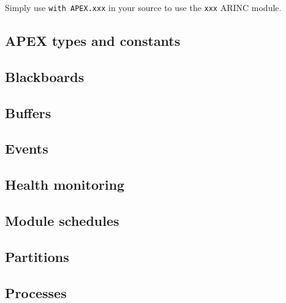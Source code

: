    Simply use \texttt{with APEX.xxx} in your source to use the \texttt{xxx}
   ARINC module.

   \subsection{APEX types and constants}
   

   \subsection{Blackboards}
   

   \subsection{Buffers}
   

   \subsection{Events}
   

   \subsection{Health monitoring}
   

   \subsection{Module schedules}
   

   \subsection{Partitions}
   

   \subsection{Processes}
   

